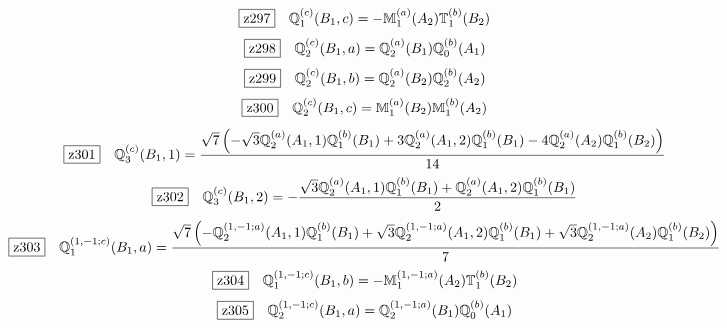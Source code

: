 \documentclass[fleqn,10pt,landscape]{jsarticle}
\begin{document}
\begin{dmath*}
\hspace*{3mm}\fbox{z297}\quad \mathbb{Q}_{1}^{(c)}(B_{1},c)=- \mathbb{M}_{1}^{(a)}(A_{2}) \mathbb{T}_{1}^{(b)}(B_{2})
\end{dmath*}
\begin{dmath*}
\hspace*{3mm}\fbox{z298}\quad \mathbb{Q}_{2}^{(c)}(B_{1},a)=\mathbb{Q}_{2}^{(a)}(B_{1}) \mathbb{Q}_{0}^{(b)}(A_{1})
\end{dmath*}
\begin{dmath*}
\hspace*{3mm}\fbox{z299}\quad \mathbb{Q}_{2}^{(c)}(B_{1},b)=\mathbb{Q}_{2}^{(a)}(B_{2}) \mathbb{Q}_{2}^{(b)}(A_{2})
\end{dmath*}
\begin{dmath*}
\hspace*{3mm}\fbox{z300}\quad \mathbb{Q}_{2}^{(c)}(B_{1},c)=\mathbb{M}_{1}^{(a)}(B_{2}) \mathbb{M}_{1}^{(b)}(A_{2})
\end{dmath*}
\begin{dmath*}
\hspace*{3mm}\fbox{z301}\quad \mathbb{Q}_{3}^{(c)}(B_{1},1)=\frac{\sqrt{7} \left(- \sqrt{3} \mathbb{Q}_{2}^{(a)}(A_{1},1) \mathbb{Q}_{1}^{(b)}(B_{1}) + 3 \mathbb{Q}_{2}^{(a)}(A_{1},2) \mathbb{Q}_{1}^{(b)}(B_{1}) - 4 \mathbb{Q}_{2}^{(a)}(A_{2}) \mathbb{Q}_{1}^{(b)}(B_{2})\right)}{14}
\end{dmath*}
\begin{dmath*}
\hspace*{3mm}\fbox{z302}\quad \mathbb{Q}_{3}^{(c)}(B_{1},2)=- \frac{\sqrt{3} \mathbb{Q}_{2}^{(a)}(A_{1},1) \mathbb{Q}_{1}^{(b)}(B_{1}) + \mathbb{Q}_{2}^{(a)}(A_{1},2) \mathbb{Q}_{1}^{(b)}(B_{1})}{2}
\end{dmath*}
\begin{dmath*}
\hspace*{3mm}\fbox{z303}\quad \mathbb{Q}_{1}^{(1,-1;c)}(B_{1},a)=\frac{\sqrt{7} \left(- \mathbb{Q}_{2}^{(1,-1;a)}(A_{1},1) \mathbb{Q}_{1}^{(b)}(B_{1}) + \sqrt{3} \mathbb{Q}_{2}^{(1,-1;a)}(A_{1},2) \mathbb{Q}_{1}^{(b)}(B_{1}) + \sqrt{3} \mathbb{Q}_{2}^{(1,-1;a)}(A_{2}) \mathbb{Q}_{1}^{(b)}(B_{2})\right)}{7}
\end{dmath*}
\begin{dmath*}
\hspace*{3mm}\fbox{z304}\quad \mathbb{Q}_{1}^{(1,-1;c)}(B_{1},b)=- \mathbb{M}_{1}^{(1,-1;a)}(A_{2}) \mathbb{T}_{1}^{(b)}(B_{2})
\end{dmath*}
\begin{dmath*}
\hspace*{3mm}\fbox{z305}\quad \mathbb{Q}_{2}^{(1,-1;c)}(B_{1},a)=\mathbb{Q}_{2}^{(1,-1;a)}(B_{1}) \mathbb{Q}_{0}^{(b)}(A_{1})
\end{dmath*}
\end{document}

